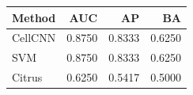 \begin{tabular}{lrrr}
\toprule
Method & AUC & AP & BA \\
\midrule
CellCNN & 0.8750 & 0.8333 & 0.6250 \\
SVM & 0.8750 & 0.8333 & 0.6250 \\
Citrus & 0.6250 & 0.5417 & 0.5000 \\
\bottomrule
\end{tabular}
